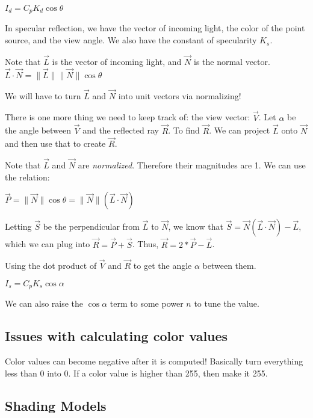 \documentclass[11pt,fleqn]{article}
\theoremstyle{definition}
\begin{document}
\begin{center}
    $I_d = C_pK_d\cos\theta$
\end{center}

In specular reflection, we have the vector of incoming light, the color of the point
source, and the view angle. We also have the constant of specularity $K_s$.

Note that $\vec{L}$ is the vector of incoming light, and $\vec{N}$ is the normal
vector. $\vec{L}\cdot\vec{N} = \|\vec{L}\|\|\vec{N}\|\cos\theta$

We will have to turn $\vec{L}$ and $\vec{N}$ into unit vectors via normalizing!

There is one more thing we need to keep track of: the view vector: $\vec{V}$. Let
$\alpha$ be the angle between $\vec{V}$ and the reflected ray $\vec{R}$. To find
$\vec{R}$. We can project $\vec{L}$ onto $\vec{N}$ and then use that to create
$\vec{R}$.

Note that $\vec{L}$ and $\vec{N}$ are \textit{normalized}. Therefore their magnitudes
are 1. We can use the relation:

\begin{center}
    $\vec{P} = \|\vec{N}\|\cos\theta = \|\vec{N}\|(\vec{L}\cdot\vec{N})$
\end{center}

Letting $\vec{S}$ be the perpendicular from $\vec{L}$ to $\vec{N}$, we know that
$\vec{S} = \vec{N} ( \vec{L} \cdot \vec{N} ) - \vec{L}$, which we can plug into
$\vec{R} = \vec{P} + \vec{S}$. Thus, $\vec{R} = 2 * \vec{P} - \vec{L}$.

Using the dot product of $\vec{V}$ and $\vec{R}$ to get the angle $\alpha$ between
them.

\begin{center}
    $I_s = C_pK_s\cos\alpha$
\end{center}

We can also raise the $\cos\alpha$ term to some power $n$ to tune the value.

\subsection{Issues with calculating color values}

Color values can become negative after it is computed! Basically turn everything less
than 0 into 0. If a color value is higher than 255, then make it 255.

\subsection{Shading Models}
\end{document}
